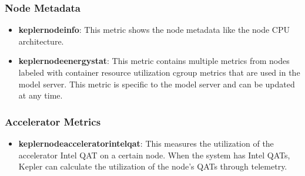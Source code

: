 \subsubsection{Node Metadata}
\begin{itemize}
    \item \textbf{kepler\textunderscore node\textunderscore info}: This metric shows the node metadata like the node CPU architecture.
    \item \textbf{kepler\textunderscore node\textunderscore energy\textunderscore stat}: This metric contains multiple metrics from nodes labeled with container resource utilization cgroup metrics that are used in the model server.
    This metric is specific to the model server and can be updated at any time.
\end{itemize}

\subsubsection{Accelerator Metrics}
\begin{itemize}
    \item \textbf{kepler\textunderscore node\textunderscore accelerator\textunderscore intel\textunderscore qat}: This measures the utilization of the accelerator Intel QAT on a certain node. When the system has Intel QATs, Kepler can calculate the utilization of the node's QATs through telemetry.
\end{itemize}